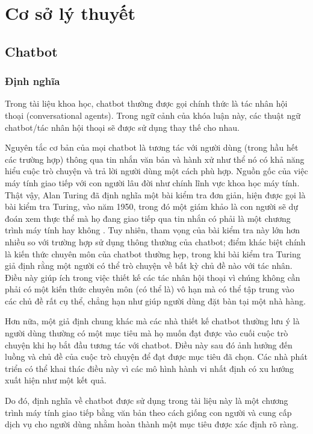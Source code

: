 \chapter{Cơ sở lý thuyết}
\label{chapter:related_work}
\section{Chatbot}
\label{section:chatbot}
\subsection{Định nghĩa}
\label{subsection:definition}


Trong tài liệu khoa học, chatbot thường được gọi chính thức là tác nhân hội thoại (conversational agents). Trong ngữ cảnh của khóa luận này, các thuật ngữ chatbot/tác nhân hội thoại sẽ được sử dụng thay thế cho nhau.


Nguyên tắc cơ bản của mọi chatbot là tương tác với người dùng (trong hầu hết các trường hợp) thông qua tin nhắn văn bản và hành xử như thể nó có khả năng hiểu cuộc trò chuyện và trả lời người dùng một cách phù hợp. Nguồn gốc của việc máy tính giao tiếp với con người lâu đời như chính lĩnh vực khoa học máy tính. Thật vậy, Alan Turing đã định nghĩa một bài kiểm tra đơn giản, hiện được gọi là bài kiểm tra Turing, vào năm 1950, trong đó một giám khảo là con người sẽ dự đoán xem thực thể mà họ đang giao tiếp qua tin nhắn có phải là một chương trình máy tính hay không \cite{radford2018improving}. Tuy nhiên, tham vọng của bài kiểm tra này lớn hơn nhiều so với trường hợp sử dụng thông thường của chatbot; điểm khác biệt chính là kiến thức chuyên môn của chatbot thường hẹp, trong khi bài kiểm tra Turing giả định rằng một người có thể trò chuyện về bất kỳ chủ đề nào với tác nhân. Điều này giúp ích trong việc thiết kế các tác nhân hội thoại vì chúng không cần phải có một kiến thức chuyên môn (có thể là) vô hạn mà có thể tập trung vào các chủ đề rất cụ thể, chẳng hạn như giúp người dùng đặt bàn tại một nhà hàng.


Hơn nữa, một giả định chung khác mà các nhà thiết kế chatbot thường lưu ý là người dùng thường có một mục tiêu mà họ muốn đạt được vào cuối cuộc trò chuyện khi họ bắt đầu tương tác với chatbot. Điều này sau đó ảnh hưởng đến luồng và chủ đề của cuộc trò chuyện để đạt được mục tiêu đã chọn. Các nhà phát triển có thể khai thác điều này vì các mô hình hành vi nhất định có xu hướng xuất hiện như một kết quả.


Do đó, định nghĩa về chatbot được sử dụng trong tài liệu này là một chương trình máy tính giao tiếp bằng văn bản theo cách giống con người và cung cấp dịch vụ cho người dùng nhằm hoàn thành một mục tiêu được xác định rõ ràng.


